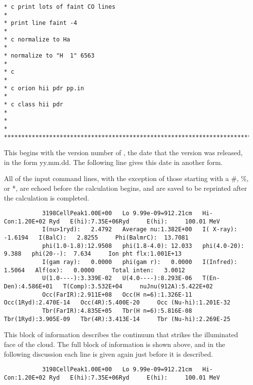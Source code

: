 {\begin{verbatim}
* c print lots of faint CO lines                                                  *
* print line faint -4                                                             *
* c normalize to Ha                                                               *
* normalize to "H  1" 6563                                                        *
* c                                                                               *
* c orion hii pdr pp.in                                                           *
* c class hii pdr                                                                 *
*                                                                                 *
***********************************************************************************
\end{verbatim}
}

This begins with the version number of \Cloudy, the date that the version
was released, in the form yy.mm.dd.
The following line gives this date
in another form.

All of the input command lines, with the exception of those starting
with a \#, \%, or *, are echoed before the calculation begins,
and are saved
to be reprinted after the calculation is completed.
{\setverbatimfontsize{\tiny}
\begin{verbatim}
           3198CellPeak1.00E+00   Lo 9.99e-09=912.21cm   Hi-Con:1.20E+02 Ryd   E(hi):7.35E+06Ryd     E(hi):     100.01 MeV
           I(nu>1ryd):   2.4792   Average nu:1.382E+00   I( X-ray):  -1.6194   I(BalC):   2.8255     Phi(BalmrC):  13.7081
           phi(1.0-1.8):12.9508   phi(1.8-4.0): 12.033   phi(4.0-20):  9.388   phi(20--):  7.634     Ion pht flx:1.001E+13
           I(gam ray):   0.0000   phi(gam r):   0.0000   I(Infred):   1.5064   Alf(ox):   0.0000     Total inten:   3.0012
           U(1.0----):3.339E-02   U(4.0----):8.293E-06   T(En-Den):4.586E+01   T(Comp):3.532E+04     nuJnu(912A):5.422E+02
           Occ(FarIR):2.911E+08   Occ(H n=6):1.326E-11   Occ(1Ryd):2.470E-14   Occ(4R):5.400E-20     Occ (Nu-hi):1.201E-32
           Tbr(FarIR):4.835E+05   Tbr(H n=6):5.816E-08   Tbr(1Ryd):3.905E-09   Tbr(4R):3.413E-14     Tbr (Nu-hi):2.269E-25
\end{verbatim}
}
This block of information describes the continuum that strikes the
illuminated face of the cloud.
The full block of information is shown above,
and in the following discussion each line is given again
just before it is described.
{\setverbatimfontsize{\tiny}
\begin{verbatim}
           3198CellPeak1.00E+00   Lo 9.99e-09=912.21cm   Hi-Con:1.20E+02 Ryd   E(hi):7.35E+06Ryd     E(hi):     100.01 MeV
\end{verbatim}
}

